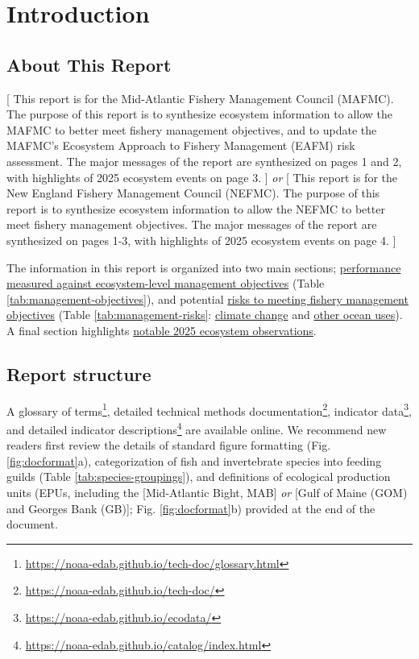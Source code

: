 \documentclass[
  10pt,
]{article}
\author{}
\date{\vspace{-2.5em}}
\begin{document}
\setcounter{page}{4}

\thispagestyle{fancy}

\section{Introduction}\label{introduction}

\subsection{About This Report}\label{about-this-report}

{[} This report is for the Mid-Atlantic Fishery Management Council (MAFMC). The purpose of this report is to synthesize ecosystem information to allow the MAFMC to better meet fishery management objectives, and to update the MAFMC's Ecosystem Approach to Fishery Management (EAFM) risk assessment. The major messages of the report are synthesized on pages 1 and 2, with highlights of 2025 ecosystem events on page 3. {]} \emph{or} {[} This report is for the New England Fishery Management Council (NEFMC). The purpose of this report is to synthesize ecosystem information to allow the NEFMC to better meet fishery management objectives. The major messages of the report are synthesized on pages 1-3, with highlights of 2025 ecosystem events on page 4. {]}

The information in this report is organized into two main sections; \hyperref[performance-relative-to-fishery-management-objectives]{performance measured against ecosystem-level management objectives} (Table \ref{tab:management-objectives}), and potential \hyperref[risks-to-meeting-fishery-management-objectives]{risks to meeting fishery management objectives} (Table \ref{tab:management-risks}: \hyperref[climate-and-ecosystem-change]{climate change} and \hyperref[other-ocean-uses-offshore-wind]{other ocean uses}). A final section highlights \hyperref[highlights]{notable 2025 ecosystem observations}.

\subsection{Report structure}\label{report-structure}

A glossary of terms\footnote{\url{https://noaa-edab.github.io/tech-doc/glossary.html}}, detailed technical methods documentation\footnote{\url{https://noaa-edab.github.io/tech-doc/}}, indicator data\footnote{\url{https://noaa-edab.github.io/ecodata/}}, and detailed indicator descriptions\footnote{\url{https://noaa-edab.github.io/catalog/index.html}} are available online. We recommend new readers first review the details of standard figure formatting (Fig. \ref{fig:docformat}a), categorization of fish and invertebrate species into feeding guilds (Table \ref{tab:species-groupings}), and definitions of ecological production units (EPUs, including the {[}Mid-Atlantic Bight, MAB{]} \emph{or} {[}Gulf of Maine (GOM) and Georges Bank (GB){]}; Fig. \ref{fig:docformat}b) provided at the end of the document.
\end{document}
